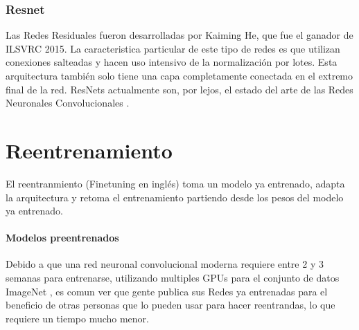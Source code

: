 \documentclass[a4paper,11pt,spanish]{book}
\begin{document}
      \subsubsection{Resnet}
	Las Redes Residuales fueron desarrolladas por Kaiming He, que fue el ganador de ILSVRC 2015. La caracteristica particular de este tipo de redes es que  utilizan conexiones salteadas
	y hacen uso intensivo de la normalización por lotes.
	Esta arquitectura también solo tiene una capa completamente conectada en el extremo final de la red. ResNets actualmente son, por lejos, el estado del arte de las
	Redes Neuronales Convolucionales \cite{Kaiming:ResNet} .

    \section {Reentrenamiento}
      El reentranmiento (Finetuning en inglés) toma un modelo ya entrenado, adapta la arquitectura y retoma el entrenamiento partiendo desde los pesos del modelo ya entrenado.

      \paragraph{Modelos preentrenados}
	Debido a que una red neuronal convolucional moderna requiere entre 2 y 3 semanas para entrenarse, utilizando multiples GPUs para el conjunto de datos ImageNet \cite{imagenet_cvpr09},
	es comun ver que gente publica sus Redes ya entrenadas para el beneficio de otras personas que lo pueden usar para hacer reentrandas, lo que requiere un tiempo mucho menor.
\end{document}

